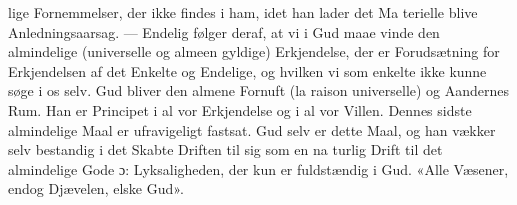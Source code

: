 \documentclass[12pt,a4paper]{book}
\begin{document}
lige Fornemmelser, der ikke findes i ham, idet han lader det Ma\-%
terielle blive Anledningsaarsag. --- Endelig følger deraf, at vi
i Gud maae vinde den almindelige (universelle og almeen\-%
gyldige) Erkjendelse, der er Forudsætning for Erkjendelsen af
det Enkelte og Endelige, og hvilken vi som enkelte ikke
kunne søge i os selv. Gud bliver den almene Fornuft (la
raison universelle) og Aandernes Rum. Han er Principet i al
vor Erkjendelse og i al vor Villen. Dennes sidste almindelige
Maal er ufravigeligt fastsat. Gud selv er dette Maal, og han
vækker selv bestandig i det Skabte Driften til sig som en na\-%
turlig Drift til det almindelige Gode ɔ: Lyksaligheden, der
kun er fuldstændig i Gud. «Alle Væsener, endog Djævelen,
elske Gud».
\end{document}

